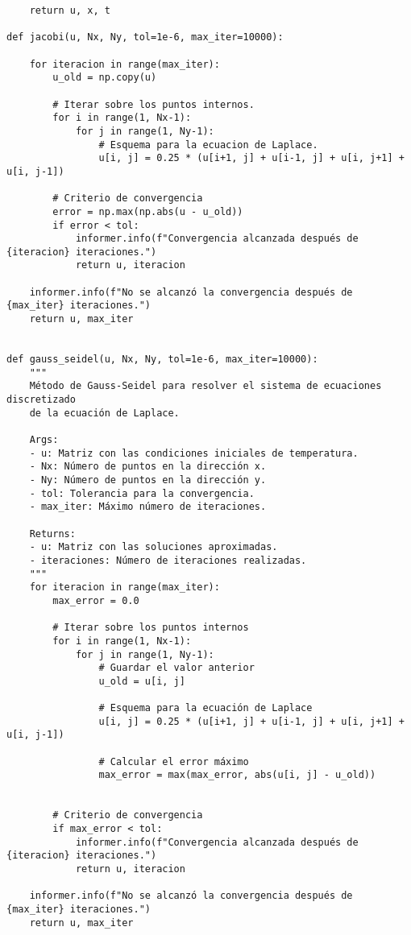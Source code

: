 \begin{verbatim}
    return u, x, t

def jacobi(u, Nx, Ny, tol=1e-6, max_iter=10000):
    
    for iteracion in range(max_iter):
        u_old = np.copy(u)
        
        # Iterar sobre los puntos internos.
        for i in range(1, Nx-1):
            for j in range(1, Ny-1):
                # Esquema para la ecuacion de Laplace.
                u[i, j] = 0.25 * (u[i+1, j] + u[i-1, j] + u[i, j+1] + u[i, j-1])
        
        # Criterio de convergencia
        error = np.max(np.abs(u - u_old))
        if error < tol:
            informer.info(f"Convergencia alcanzada después de {iteracion} iteraciones.")
            return u, iteracion
        
    informer.info(f"No se alcanzó la convergencia después de {max_iter} iteraciones.")
    return u, max_iter


def gauss_seidel(u, Nx, Ny, tol=1e-6, max_iter=10000):
    """
    Método de Gauss-Seidel para resolver el sistema de ecuaciones discretizado
    de la ecuación de Laplace.
    
    Args:
    - u: Matriz con las condiciones iniciales de temperatura.
    - Nx: Número de puntos en la dirección x.
    - Ny: Número de puntos en la dirección y.
    - tol: Tolerancia para la convergencia.
    - max_iter: Máximo número de iteraciones.
    
    Returns:
    - u: Matriz con las soluciones aproximadas.
    - iteraciones: Número de iteraciones realizadas.
    """
    for iteracion in range(max_iter):
        max_error = 0.0
        
        # Iterar sobre los puntos internos
        for i in range(1, Nx-1):
            for j in range(1, Ny-1):
                # Guardar el valor anterior
                u_old = u[i, j]
                
                # Esquema para la ecuación de Laplace
                u[i, j] = 0.25 * (u[i+1, j] + u[i-1, j] + u[i, j+1] + u[i, j-1])
                
                # Calcular el error máximo
                max_error = max(max_error, abs(u[i, j] - u_old))
        
        
        # Criterio de convergencia
        if max_error < tol:
            informer.info(f"Convergencia alcanzada después de {iteracion} iteraciones.")
            return u, iteracion
        
    informer.info(f"No se alcanzó la convergencia después de {max_iter} iteraciones.")
    return u, max_iter



\end{verbatim}
